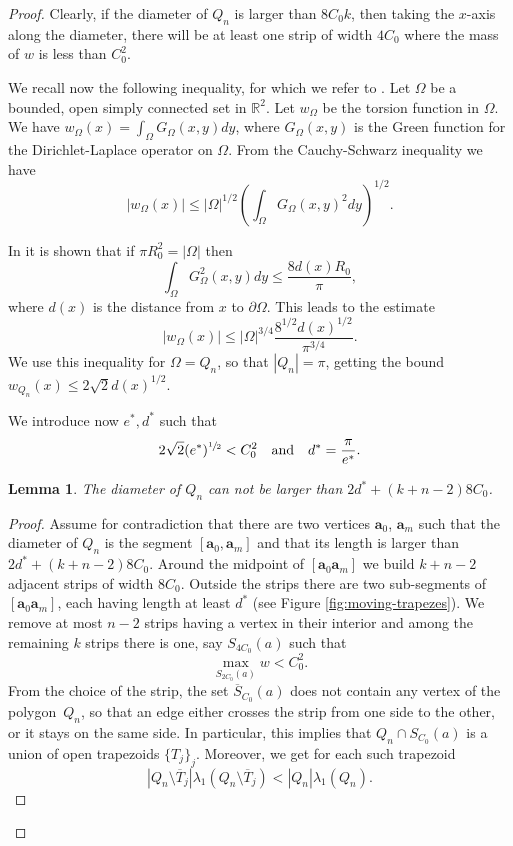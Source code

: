 \documentclass[11pt]{article}
\numberwithin{equation}{section}\newtheorem*{jepEnonce}{\jepEnonceTitle}\newenvironment{enonce*}[1]{\def\jepEnonceTitle{#1}\jepEnonce}{\endjepEnonce}\newtheorem*{conj*}{Conjecture}
\theoremstyle{plain}
\newtheorem{lemma}[thm]{Lemma}
\theoremstyle{definition}
\newcommand{\bo}[1]{{\boldsymbol#1}}
\def\R{\mathbb{R}}
\newcommand{\Om}{\Omega}
\newcommand{\lb}{\lambda}
\newcommand{\sm}{\setminus}
\newcommand{\ov}{\overline}
\let\jepOriginalSfrac\sfrac
\renewcommand{\sfrac}[2]{{\jepOriginalSfrac{#1}{#2}}}
\begin{document}
\begin{proof}
Clearly, if the diameter of $Q_n$ is larger than $8C_0k$, then taking the $x$-axis along the diameter, there will be at least one strip of width $4 C_0$ where the mass of $w$ is less than $C_0^2$.

We recall now the following inequality, for which we refer to \cite{BoVdB99}. Let $\Om$ be a bounded, open simply connected set in $\R^2$.
Let $w_\Om$ be the torsion function in $\Omega$.
We have
$w_\Om(x) = \int_\Omega G_\Omega(x,y)dy$, where $G_\Omega(x,y)$ is the Green function for the Dirichlet-Laplace operator on $\Omega$. From the Cauchy-Schwarz inequality we have
\[
|w_\Om(x)| \leq |\Omega|^{1/2} \left(\int_\Omega G_\Omega (x,y)^2dy\right)^{1/2}.
\]

In \cite[Proof of Th.\,1.5, Ineq.\,(5.16)]{BoVdB99} it is shown that if $\pi R_0^2=|\Omega|$ then
\[
\int_\Omega G_\Omega^2(x,y)dy \leq \frac{8 d(x)R_0}{\pi},
\]
where $d(x)$ is the distance from $x$ to $\partial \Omega$. This leads to the estimate
\begin{equation}\label{bb64.5}
|w_\Om(x)|\leq |\Omega|^{3/4}\frac{8^{1/2}d(x)^{1/2}}{\pi^{3/4}}.
\end{equation}
We use this inequality for $\Om=Q_n$, so that $|Q_n|=\pi$, getting the bound $w_{Q_n}(x) \le 2 \sqrt{2} d(x)^{1/2}$.

We introduce now $e^*, d^*$ such that
\begin{equation}\label{bb64.6}
2\sqrt{2} (e^*)^{\sfrac 12}< C_0^2\quad \mbox{and} \quad d^*=\frac{\pi}{e^*}.
\end{equation}

\begin{lemma}\label{bb64}
The diameter of $Q_n$ can not be larger than $2 d^* + (k+n-2)8 C_0$.
\end{lemma}

\begin{proof}
Assume for contradiction that there are two vertices $\bo a_0$, $\bo a_m$ such that the diameter of $Q_n$ is the segment $[\bo a_0, \bo a_m]$ and that its length is larger than $2 d^* + { (k+n-2)8 C_0} $.
{Around the midpoint of $[\bo a_0 \bo a_m]$ we build $k+n-2$ adjacent strips of width $8 C_0$. Outside the strips there are two sub-segments of $[\bo a_0 \bo a_m]$, each having length at least $d^*$ (see Figure \ref{fig:moving-trapezes}}). We remove at most $n-2$ strips having a vertex in their interior and among the remaining $k$ strips there is one, say $S_{4C_0}(a)$ such that
\[
\max _{S_{2C_0}(a)} w <C_0^2.
\]
From the choice of the strip, the set $\ov S_{C_0}(a)$ does not contain any vertex of the polygon~$Q_n$, so that an edge either crosses the strip from one side to the other, or it stays on the same side. In particular, this implies that $Q_n\cap S_{C_0}(a)$ is a union of open {trapezoids} $\{T_j\}_j$. Moreover, we get for each such {trapezoid}
\[
|Q_n\sm \ov T_j|\lb_1(Q_n\sm \ov T_j) < |Q_n| \lb_1(Q_n).
\]


\end{proof}
\end{proof}
\end{document}
